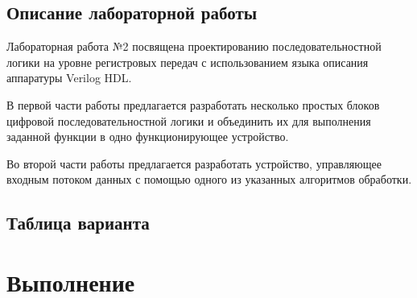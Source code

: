 \documentclass[12pt,onecolumn]{article}
\begin{document}
\subsection{Описание лабораторной работы}

Лабораторная работа №2 посвящена проектированию последовательностной логики на уровне регистровых передач с использованием языка описания аппаратуры Verilog HDL.

В первой части работы предлагается разработать несколько простых блоков цифровой последовательностной логики и объединить их для выполнения заданной функции в одно функционирующее устройство.

Во второй части работы предлагается разработать устройство, управляющее входным потоком данных с помощью одного из указанных алгоритмов обработки.

\subsection{Таблица варианта}
\begin{table}[H]
  \centering
  \end{table}

\section{Выполнение}
\end{document}
